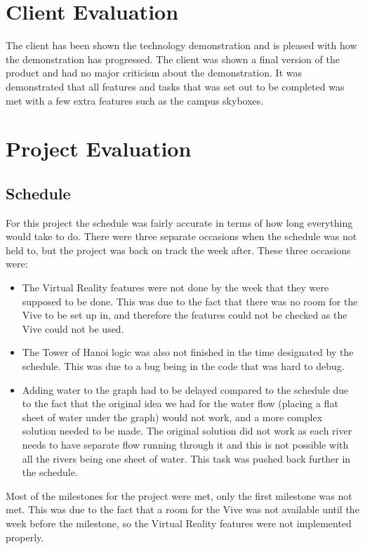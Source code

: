 \section{Client Evaluation}
	The client has been shown the technology demonstration and is pleased with how the demonstration has progressed. The client was shown a final version of the product and had no major criticism about the demonstration. It was demonstrated that all features and tasks that was set out to be completed was met with a few extra features such as the campus skyboxes.

\section{Project Evaluation}
\subsection{Schedule}
	For this project the schedule was fairly accurate in terms of how long everything would take to do. There were three separate occasions when the schedule was not held to, but the project was back on track the week after. These three occasions were:
	\begin{itemize}
		\item The Virtual Reality features were not done by the week that they were supposed to be done. This was due to the fact that there was no room for the Vive to be set up in, and therefore the features could not be checked as the Vive could not be used.
		\item The Tower of Hanoi logic was also not finished in the time designated by the schedule. This was due to a bug being in the code that was hard to debug.
		\item Adding water to the graph had to be delayed compared to the schedule due to the fact that the original idea we had for the water flow (placing a flat sheet of water under the graph) would not work, and a more complex solution needed to be made. The original solution did not work as each river needs to have separate flow running through it and this is not possible with all the rivers being one sheet of water. This task was pushed back further in the schedule.
	\end{itemize}

	Most of the milestones for the project were met, only the first milestone was not met. This was due to the fact that a room for the Vive was not available until the week before the milestone, so the Virtual Reality features were not implemented properly.

